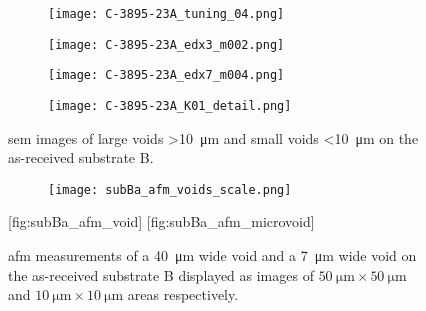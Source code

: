 \begin{figure}[htbp]
    \centering
    \begin{subfigure}[t]{\textwidth}
    \caption{}\label{fig:subBa_voids}
          \begin{minipage}[t]{0.49\linewidth}
            \centering
            \texttt{[image: C-3895-23A\_tuning\_04.png]}
          \end{minipage}
          \hfill
          \begin{minipage}[t]{0.49\linewidth}
            \centering
            \texttt{[image: C-3895-23A\_edx3\_m002.png]}
          \end{minipage}
    \end{subfigure}%
    \par\bigskip
    \begin{subfigure}[t]{\textwidth}
    \caption{}\label{fig:subBa_microvoids}
          \begin{minipage}[t]{0.49\linewidth}
            \centering
            \texttt{[image: C-3895-23A\_edx7\_m004.png]}
          \end{minipage}
          \hfill
          \begin{minipage}[t]{0.49\linewidth}
            \centering
            \texttt{[image: C-3895-23A\_K01\_detail.png]}
          \end{minipage}
    \end{subfigure}%
    \caption[\Ac{sem} images of voids on substrate B.]{\Ac{sem} images of  large voids \SI{>10}{\micro\metre} and  small voids \SI{<10}{\micro\metre} on the as-received substrate B.}
    \label{fig:SEM_C389523_voids}
\end{figure}

\begin{figure}
    \centering
    \begin{subfigure}[c]{0.032\linewidth}
        \label{fig:subBa_afm_voids_scale}\captionsetup{list=no}
        \texttt{[image: subBa\_afm\_voids\_scale.png]}
    \end{subfigure}
    \hfill
    [fig:subBa_afm_void]
    \hfill
    [fig:subBa_afm_microvoid]
    \caption[\Ac{afm} measurements of voids on as-received substrate B.]{\Ac{afm} measurements of  a \SI{40}{\micro\metre} wide void and  a \SI{7}{\micro\metre} wide void on the as-received substrate B displayed as images of $\SI{50}{\micro\metre}\times\SI{50}{\micro\metre}$ and $\SI{10}{\micro\metre}\times\SI{10}{\micro\metre}$ areas respectively.}
    \label{fig:subBa_afm_voids}
\end{figure}

